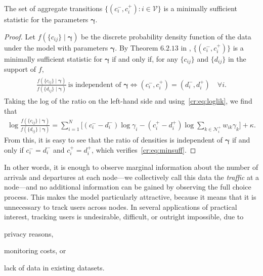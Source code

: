 \begin{theorem}
The set of aggregate transitions  $\{ (c^-_i, c^+_i) : i \in \mathcal{V} \}$ is a minimally sufficient statistic for the parameters $\bm{\gamma}$.
\end{theorem}

\begin{proof}
Let $f(\{ c_{ij} \} \mid \bm{\gamma})$ be the discrete probability density function of the data under the model with parameters $\bm{\gamma}$.
By Theorem $6.2.13$ in \citet{casella2002statistical}, $\{ (c^-_i, c^+_i) \}$ is a minimally sufficient statistic for $\bm{\gamma}$ if and only if, for any $\{ c_{ij} \}$ and $\{ d_{ij} \}$ in the support of $f$,
\begin{align}
\label{cr:eq:minsuff}
\begin{aligned}
\frac{ f(\{ c_{ij} \} \mid \bm{\gamma}) }{ f(\{ d_{ij} \} \mid \bm{\gamma}) }\ \text{is independent of $\bm{\gamma}$}
\iff (c^-_i, c^+_i) = (d^-_i, d^+_i) \quad \forall i.
\end{aligned}
\end{align}
Taking the log of the ratio on the left-hand side and using~\eqref{cr:eq:loglik}, we find that
\begin{align*}
\log \frac{ f(\{ c_{ij} \} \mid \bm{\gamma}) }{ f(\{ d_{ij} \} \mid \bm{\gamma}) } =
  \sum_{i = 1}^N \bigg[ (c^-_i\!-\!d^-_i) \log \gamma_i
                       - (c^+_i\!-\!d^+_i) \log\!\sum_{k \in \mathcal{N}^+_i}\!w_{ik} \gamma_k \bigg] + \kappa.
\end{align*}
From this, it is easy to see that the ratio of densities is independent of $\bm{\gamma}$ if and only if $c^-_i = d^-_i$ and $c^+_i = d^+_i$, which verifies~\eqref{cr:eq:minsuff}.
\end{proof}

In other words, it is enough to observe marginal information about the number of arrivals and departures at each node---we collectively call this data the \emph{traffic} at a node---and no additional information can be gained by observing the full choice process.
This makes the model particularly attractive, because it means that it is unnecessary to track users across nodes.
In several applications of practical interest, tracking users is undesirable, difficult, or outright impossible, due to
\begin{enuminline}
\item privacy reasons,
\item monitoring costs, or
\item lack of data in existing datasets.
\end{enuminline}

